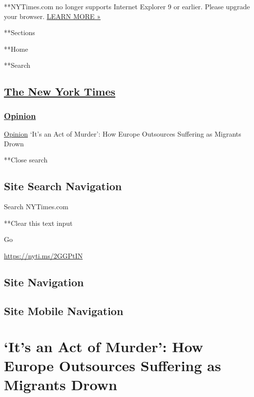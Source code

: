  **NYTimes.com no longer supports Internet Explorer 9 or earlier. Please
upgrade your browser.
\href{http://www.nytimes.com/content/help/site/ie9-support.html}{LEARN
MORE »}

**Sections

**Home

**Search

\hypertarget{the-new-york-times}{%
\subsection{\texorpdfstring{\href{http://www.nytimes.com/}{The New York
Times}}{The New York Times}}\label{the-new-york-times}}

\hypertarget{-opinion-}{%
\subsubsection{\texorpdfstring{ \href{/section/opinion}{Opinion}
}{ Opinion }}\label{-opinion-}}

 \href{/section/opinion}{Opinion} \textbar{}`It's an Act of Murder': How
Europe Outsources Suffering as Migrants Drown

**Close search

\hypertarget{site-search-navigation}{%
\subsection{Site Search Navigation}\label{site-search-navigation}}

Search NYTimes.com

**Clear this text input

Go

\url{https://nyti.ms/2GGPtIN}

\hypertarget{site-navigation}{%
\subsection{Site Navigation}\label{site-navigation}}

\hypertarget{site-mobile-navigation}{%
\subsection{Site Mobile Navigation}\label{site-mobile-navigation}}

\hypertarget{its-an-act-of-murder-how-europe-outsources-suffering-as-migrants-drown}{%
\section{`It's an Act of Murder': How Europe Outsources Suffering as
Migrants
Drown}\label{its-an-act-of-murder-how-europe-outsources-suffering-as-migrants-drown}}

